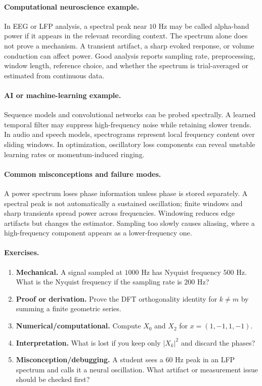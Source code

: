 \paragraph{Computational neuroscience example.}
In EEG or LFP analysis, a spectral peak near \(10\) Hz may be called alpha-band power if it appears in the relevant recording context. The spectrum alone does not prove a mechanism. A transient artifact, a sharp evoked response, or volume conduction can affect power. Good analysis reports sampling rate, preprocessing, window length, reference choice, and whether the spectrum is trial-averaged or estimated from continuous data.

\paragraph{AI or machine-learning example.}
Sequence models and convolutional networks can be probed spectrally. A learned temporal filter may suppress high-frequency noise while retaining slower trends. In audio and speech models, spectrograms represent local frequency content over sliding windows. In optimization, oscillatory loss components can reveal unstable learning rates or momentum-induced ringing.

\paragraph{Common misconceptions and failure modes.}
A power spectrum loses phase information unless phase is stored separately. A spectral peak is not automatically a sustained oscillation; finite windows and sharp transients spread power across frequencies. Windowing reduces edge artifacts but changes the estimator. Sampling too slowly causes aliasing, where a high-frequency component appears as a lower-frequency one.

\paragraph{Exercises.}
\begin{enumerate}[label=\textbf{28.2.\arabic*.}, leftmargin=*]
\item \textbf{Mechanical.} A signal sampled at \(1000\) Hz has Nyquist frequency \(500\) Hz. What is the Nyquist frequency if the sampling rate is \(200\) Hz?
\item \textbf{Proof or derivation.} Prove the DFT orthogonality identity for \(k\neq m\) by summing a finite geometric series.
\item \textbf{Numerical/computational.} Compute \(X_0\) and \(X_2\) for \(x=(1,-1,1,-1)\).
\item \textbf{Interpretation.} What is lost if you keep only \(|X_k|^2\) and discard the phases?
\item \textbf{Misconception/debugging.} A student sees a \(60\) Hz peak in an LFP spectrum and calls it a neural oscillation. What artifact or measurement issue should be checked first?
\end{enumerate}

